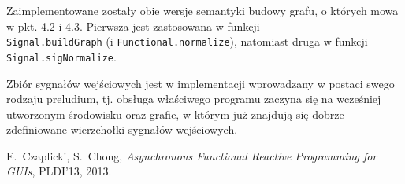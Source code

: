 \documentclass[11pt,leqno]{article}
\begin{document}
Zaimplementowane zostały obie wersje semantyki budowy grafu, o których mowa w pkt. 4.2 i 4.3. Pierwsza jest zastosowana w funkcji \\ \texttt{Signal.buildGraph} (i \texttt{Functional.normalize}), natomiast druga w funkcji \texttt{Signal.sigNormalize}.

Zbiór sygnałów wejściowych jest w implementacji wprowadzany w postaci swego rodzaju preludium, tj. obsługa właściwego programu zaczyna się na wcześniej utworzonym środowisku oraz grafie, w którym już znajdują się dobrze zdefiniowane wierzchołki sygnałów wejściowych.

\thispagestyle{empty}
\begin{thebibliography}{99}

   E.~Czaplicki, S.~Chong, \textit{Asynchronous Functional Reactive Programming for GUIs},
              PLDI’13, 2013.
	  
\end{thebibliography}
\end{document}
